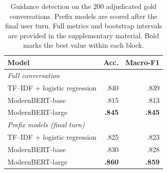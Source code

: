 \begin{table}[t]
\centering
\footnotesize
\setlength{\tabcolsep}{8pt}
\begin{tabular}{lrr}
\toprule
Model & Acc. & Macro-F1 \\
\midrule
\multicolumn{3}{l}{\textit{Full conversation}} \\
\quad TF--IDF + logistic regression & .840 & .839 \\
\quad ModernBERT-base & .815 & .813 \\
\quad ModernBERT-large & \textbf{.845} & \textbf{.845} \\
\midrule
\multicolumn{3}{l}{\textit{Prefix models (final turn)}} \\
\quad TF--IDF + logistic regression & .825 & .823 \\
\quad ModernBERT-base & .830 & .828 \\
\quad ModernBERT-large & \textbf{.860} & \textbf{.859} \\
\bottomrule
\end{tabular}
\caption{Guidance detection on the 200 adjudicated gold conversations. Prefix models are scored after the final user turn. Full metrics and bootstrap intervals are provided in the supplementary material. Bold marks the best value within each block.}
\label{tab:gold-guidance}
\end{table}
